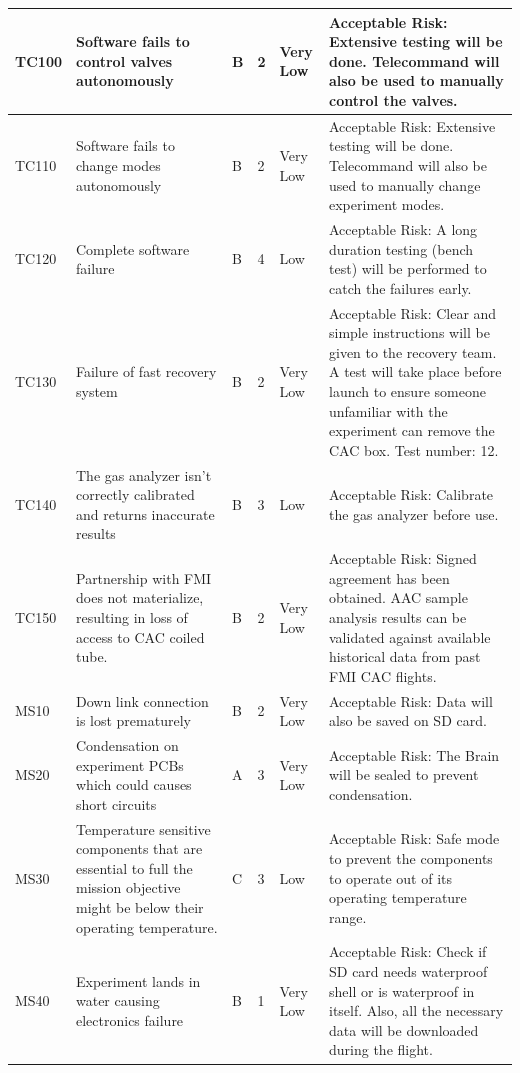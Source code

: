 \documentclass[a4paper,12pt,oneside]{article} %
\begin{document}
\begin{landscape}
\begin{longtable}{|m{}| m{} |m{} |m{}|m{}| m{}|}
TC100 & Software fails to control valves autonomously & B & 2 & \cellcolor[HTML]{34FF34}Very Low & Acceptable Risk: Extensive testing will be done. Telecommand will also be used to manually control the valves. \\ \hline
TC110 & Software fails to change modes autonomously & B & 2 & \cellcolor[HTML]{34FF34}Very Low & Acceptable Risk: Extensive testing will be done. Telecommand will also be used to manually change experiment modes. \\ \hline
TC120 & Complete software failure & B & 4 & \cellcolor[HTML]{FCFF2F}Low & Acceptable Risk: A long duration testing (bench test) will be performed to catch the failures early. \\ \hline
TC130 & Failure of fast recovery system & B & 2 & \cellcolor[HTML]{34FF34}Very Low & Acceptable Risk: Clear and simple instructions will be given to the recovery team. A test will take place before launch to ensure someone unfamiliar with the experiment can remove the CAC box. Test number: 12. \\ \hline
TC140 & The gas analyzer isn't correctly calibrated and returns inaccurate results & B & 3 & \cellcolor[HTML]{FCFF2F}Low & Acceptable Risk: Calibrate the gas analyzer before use.\\ \hline 
TC150 & Partnership with FMI does not materialize, resulting in loss of access to CAC coiled tube. & B & 2 & \cellcolor[HTML]{34FF34}Very Low & Acceptable Risk: Signed agreement has been obtained. AAC sample analysis results can be validated against available historical data from past FMI CAC flights. \\ \hline 
MS10 & Down link connection is lost prematurely & B & 2 & \cellcolor[HTML]{34FF34}Very Low & Acceptable Risk: Data will also be saved on SD card. \\ \hline
MS20 & Condensation on experiment PCBs which could causes short circuits & A & 3 & \cellcolor[HTML]{34FF34}Very Low & Acceptable Risk: The Brain will be sealed to prevent condensation. \\ \hline
MS30 & Temperature sensitive components that are essential to full the mission objective might be below their operating temperature. & C & 3 & \cellcolor[HTML]{FCFF2F}Low & Acceptable Risk: Safe mode to prevent the components to operate out of its operating temperature range. \\ \hline
MS40 & Experiment lands in water causing electronics failure & B & 1 & \cellcolor[HTML]{34FF34}Very Low & Acceptable Risk: Check if SD card needs waterproof shell or is waterproof in itself. Also, all the necessary data will be downloaded during the flight. \\ \hline

\end{longtable}
\end{landscape}
\end{document}
